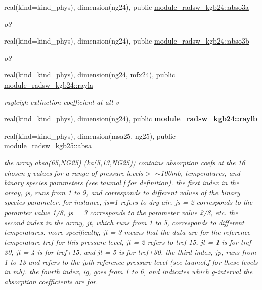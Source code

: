 \begin{Indent}
\begin{DoxyCompactItemize}
real(kind=kind\+\_\+phys), dimension(ng24), public \hyperlink{group__module__radsw__kgbnn_ga3df78e9baa46df182aad6ff9b1662dc4}{module\+\_\+radsw\+\_\+kgb24\+::abso3a}
\begin{DoxyCompactList}\small\item\em o3 \end{DoxyCompactList}\item 
real(kind=kind\+\_\+phys), dimension(ng24), public \hyperlink{group__module__radsw__kgbnn_ga6b44aa0637523aa1f78de5b4d16c693b}{module\+\_\+radsw\+\_\+kgb24\+::abso3b}
\begin{DoxyCompactList}\small\item\em o3 \end{DoxyCompactList}\item 
real(kind=kind\+\_\+phys), dimension(ng24, mfx24), public \hyperlink{group__module__radsw__kgbnn_gab24774576414b5d210c34916c3d19404}{module\+\_\+radsw\+\_\+kgb24\+::rayla}
\begin{DoxyCompactList}\small\item\em rayleigh extinction coefficient at all v \end{DoxyCompactList}\item 
real(kind=kind\+\_\+phys), dimension(ng24), public {\bfseries module\+\_\+radsw\+\_\+kgb24\+::raylb}
\item 
real(kind=kind\+\_\+phys), dimension(msa25, ng25), public \hyperlink{group__module__radsw__kgbnn_gaf4daf474954d4689219ada6d0662aceb}{module\+\_\+radsw\+\_\+kgb25\+::absa}
\begin{DoxyCompactList}\small\item\em the array absa(65,\+N\+G25) (ka(5,13,\+N\+G25)) contains absorption coefs at the 16 chosen g-\/values for a range of pressure levels$>$ $\sim$100mb, temperatures, and binary species parameters (see taumol.\+f for definition). the first index in the array, js, runs from 1 to 9, and corresponds to different values of the binary species parameter. for instance, js=1 refers to dry air, js = 2 corresponds to the paramter value 1/8, js = 3 corresponds to the parameter value 2/8, etc. the second index in the array, jt, which runs from 1 to 5, corresponds to different temperatures. more specifically, jt = 3 means that the data are for the reference temperature tref for this pressure level, jt = 2 refers to tref-\/15, jt = 1 is for tref-\/30, jt = 4 is for tref+15, and jt = 5 is for tref+30. the third index, jp, runs from 1 to 13 and refers to the jpth reference pressure level (see taumol.\+f for these levels in mb). the fourth index, ig, goes from 1 to 6, and indicates which g-\/interval the absorption coefficients are for. \end{DoxyCompactList}\item 

\end{DoxyCompactItemize}
\end{Indent}
